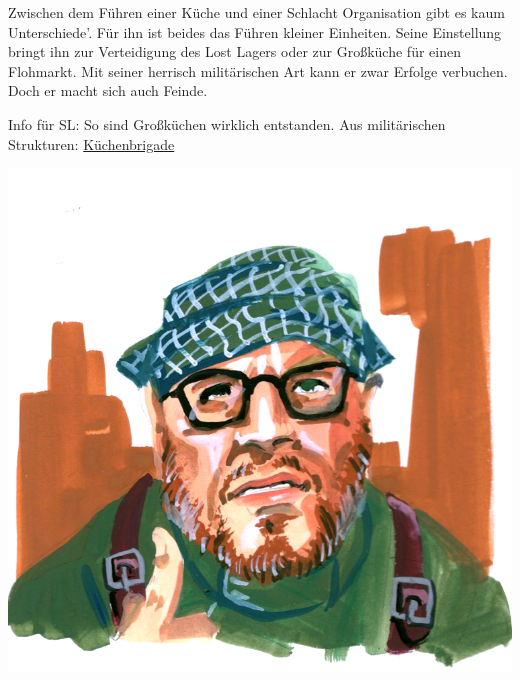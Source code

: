 Zwischen dem Führen einer Küche und einer Schlacht Organisation gibt es kaum Unterschiede'. Für ihn ist beides das Führen kleiner Einheiten. Seine Einstellung bringt ihn zur Verteidigung des Lost Lagers oder zur Großküche für einen Flohmarkt. Mit seiner herrisch militärischen Art kann er zwar Erfolge verbuchen. Doch er macht sich auch Feinde.

Info für SL: So sind Großküchen wirklich entstanden. Aus militärischen Strukturen: \href{https://de.wikipedia.org/wiki/K%C3%BCchenbrigade}{Küchenbrigade}

\begin{center}
    \includegraphics[scale=0.4]{portraits/Flohmarkt_Gustav.png}
\end{center}

